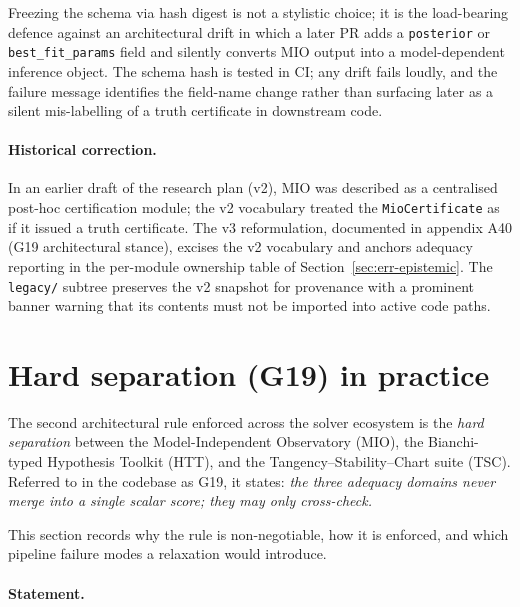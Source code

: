 Freezing the schema via hash digest is not a stylistic
choice; it is the load-bearing defence against an
architectural drift in which a later PR adds a
\texttt{posterior} or \texttt{best\_fit\_params} field and
silently converts MIO output into a model-dependent
inference object.  The schema hash is tested in CI; any
drift fails loudly, and the failure message identifies the
field-name change rather than surfacing later as a silent
mis-labelling of a truth certificate in downstream code.


\paragraph{Historical correction.}

In an earlier draft of the research plan (v2), MIO was
described as a centralised post-hoc certification module; the
v2 vocabulary treated the \texttt{MioCertificate} as if it
issued a truth certificate.  The v3 reformulation, documented
in appendix A40 (G19 architectural stance), excises the v2
vocabulary and anchors adequacy reporting in the per-module
ownership table of Section~\ref{sec:err-epistemic}.  The
\texttt{legacy/} subtree preserves the v2 snapshot for
provenance with a prominent banner warning that its contents
must not be imported into active code paths.


\section{Hard separation (G19) in practice}
\label{sec:err-g19}

The second architectural rule enforced across the solver
ecosystem is the \emph{hard separation} between the
Model-Independent Observatory (MIO), the Bianchi-typed
Hypothesis Toolkit (HTT), and the Tangency--Stability--Chart
suite (TSC).  Referred to in the codebase as G19, it states:
\emph{the three adequacy domains never merge into a single
scalar score; they may only cross-check.}

This section records why the rule is non-negotiable, how it
is enforced, and which pipeline failure modes a relaxation
would introduce.


\paragraph{Statement.}

